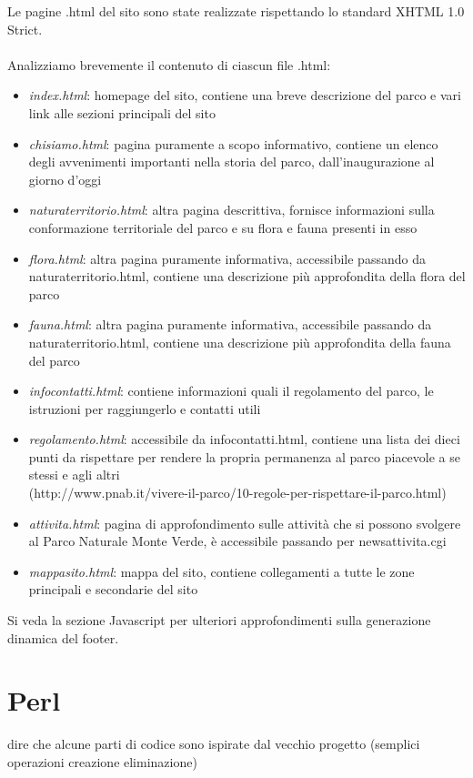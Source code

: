 \documentclass[12pt]{article}
\begin{document}
Le pagine .html del sito sono state realizzate rispettando lo standard XHTML 1.0 Strict.\\ \\
Analizziamo brevemente il contenuto di ciascun file .html:
\begin{itemize}
\item \textit{index.html}: homepage del sito, contiene una breve descrizione del parco e vari link alle sezioni principali del sito
\item \textit{chisiamo.html}:  pagina puramente a scopo informativo, contiene un elenco degli avvenimenti importanti nella storia del parco, dall'inaugurazione al giorno d'oggi
\item \textit{naturaterritorio.html}:  altra pagina descrittiva, fornisce informazioni sulla conformazione territoriale del parco e su flora e fauna presenti in esso
\item \textit{flora.html}: altra pagina puramente informativa, accessibile passando da naturaterritorio.html, contiene una descrizione più approfondita della flora del parco
\item \textit{fauna.html}: altra pagina puramente informativa, accessibile passando da naturaterritorio.html, contiene una descrizione più approfondita della fauna del parco
\item \textit{infocontatti.html}: contiene informazioni quali il regolamento del parco, le istruzioni per raggiungerlo e contatti utili
\item \textit{regolamento.html}: accessibile da infocontatti.html, contiene una lista dei dieci punti da rispettare per rendere la propria permanenza al parco piacevole a se stessi e agli altri\\ (http://www.pnab.it/vivere-il-parco/10-regole-per-rispettare-il-parco.html)
\item \textit{attivita.html}: pagina di approfondimento sulle attività che si possono svolgere al Parco Naturale Monte Verde, è accessibile passando per newsattivita.cgi
\item \textit{mappasito.html}: mappa del sito, contiene collegamenti a tutte le zone principali e secondarie del sito
\end{itemize}
Si veda la sezione Javascript per ulteriori approfondimenti sulla generazione dinamica del footer.

			\section{Perl} dire che alcune parti di codice sono ispirate dal vecchio progetto (semplici operazioni creazione eliminazione)
		
\end{document}
